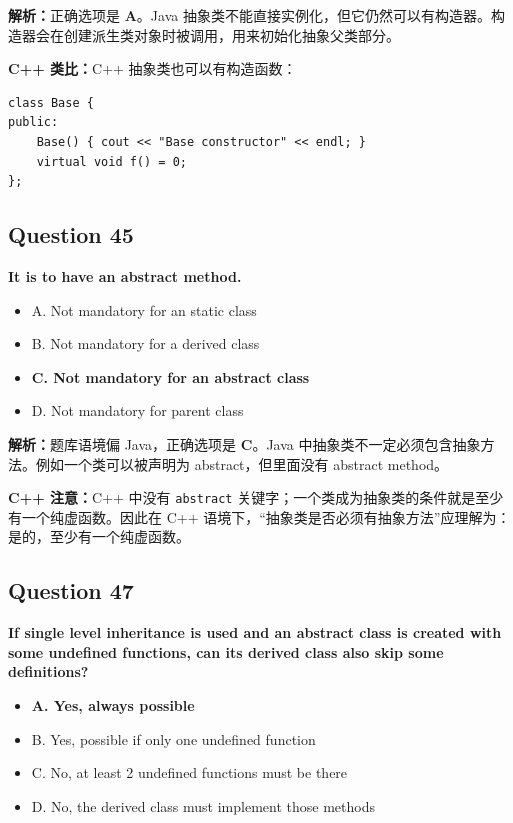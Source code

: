 \documentclass[11pt, a4paper]{article}
\begin{document}
\textbf{解析：}正确选项是 \textbf{A}。Java 抽象类不能直接实例化，但它仍然可以有构造器。构造器会在创建派生类对象时被调用，用来初始化抽象父类部分。

\textbf{C++ 类比：}C++ 抽象类也可以有构造函数：
\begin{lstlisting}
class Base {
public:
    Base() { cout << "Base constructor" << endl; }
    virtual void f() = 0;
};
\end{lstlisting}


\subsection*{Question 45}
\textbf{It is \underline{\hspace{2cm}} to have an abstract method.}
\begin{itemize}
    \item A. Not mandatory for an static class
    \item B. Not mandatory for a derived class
    \item \textbf{C. Not mandatory for an abstract class}
    \item D. Not mandatory for parent class
\end{itemize}

\textbf{解析：}题库语境偏 Java，正确选项是 \textbf{C}。Java 中抽象类不一定必须包含抽象方法。例如一个类可以被声明为 abstract，但里面没有 abstract method。

\textbf{C++ 注意：}C++ 中没有 \texttt{abstract} 关键字；一个类成为抽象类的条件就是至少有一个纯虚函数。因此在 C++ 语境下，“抽象类是否必须有抽象方法”应理解为：是的，至少有一个纯虚函数。


\subsection*{Question 47}
\textbf{If single level inheritance is used and an abstract class is created with some undefined functions, can its derived class also skip some definitions?}
\begin{itemize}
    \item \textbf{A. Yes, always possible}
    \item B. Yes, possible if only one undefined function
    \item C. No, at least 2 undefined functions must be there
    \item D. No, the derived class must implement those methods
\end{itemize}
\end{document}
